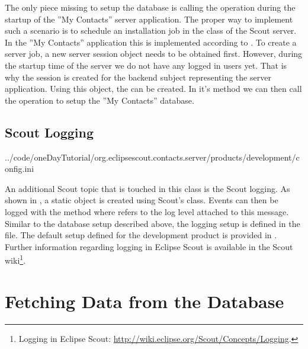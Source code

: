 \documentclass[a4paper,10pt,twoside]{book}
\begin{document}
The only piece missing to setup the database is calling the  operation during the startup of the ''My Contacts'' server application.
The proper way to implement such a scenario is to schedule an installation job in the  class of the Scout server. 
In the ''My Contacts'' application this is implemented according to . 
To create a server job, a new server session object needs to be obtained first. 
However, during the startup time of the server we do not have any logged in users yet. 
That is why the session is created for the backend subject representing the server application. 
Using this  object, the  can be created. 
In it's  method we can then call the  operation to setup the ''My Contacts'' database.

\subsection{Scout Logging}


{../code/oneDayTutorial/org.eclipsescout.contacts.server/products/development/config.ini}

An additional Scout topic that is touched in this  class is the Scout logging. 
As shown in , a static  object is created using Scout's  class. 
Events can then be logged with the  method where  refers to the log level attached to this message. 
Similar to the database setup described above, the logging setup is defined in the  file. 
The default setup defined for the development product is provided in .
Further information regarding logging in Eclipse Scout is available in the Scout wiki\footnote{
Logging in Eclipse Scout: \url{http://wiki.eclipse.org/Scout/Concepts/Logging}.
}.

\section{Fetching Data from the Database}
\end{document}
